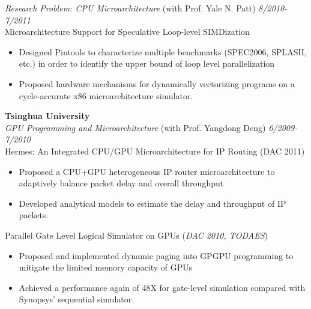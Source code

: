 \documentclass[margin, 9pt]{res} %
\begin{document}
\begin{resume}
\medskip
{\large\textit{Research Problem: CPU Microarchitecture} (with Prof. Yale N. Patt)} \hfill\textit{8/2010-7/2011}\\

\vspace*{-7pt}
Microarchitecture Support for Speculative Loop-level SIMDization\\
\vspace*{-10pt}
\begin{itemize}[leftmargin=*] \itemsep -3pt
\vspace*{-5pt}
	\item Designed Pintools to characterize multiple benchmarks (SPEC2006, SPLASH, etc.) in order to identify the upper bound of loop level parallelization
	\item Proposed hardware mechanisms for dynamically vectorizing programs on a cycle-accurate x86 microarchitecture simulator.
\end{itemize}

\bigskip
{\large\textbf{Tsinghua University}}\\

\vspace*{-7pt}
{\large\textit{GPU Programming and Microarchitecture} (with Prof. Yangdong Deng)} \hfill\textit{6/2009-7/2010}\\

\vspace*{-7pt}
Hermes: An Integrated CPU/GPU Microarchitecture for IP Routing \hfill(DAC 2011)\\
\vspace*{-10pt}
\begin{itemize}[leftmargin=*] \itemsep -3pt
\vspace*{-5pt}
	\item Proposed a CPU+GPU heterogeneous IP router microarchitecture to adaptively balance packet delay and overall throughput
	\item Developed analytical models to estimate the delay and throughput of IP packets.
\end{itemize}

\medskip
Parallel Gate Level Logical Simulator on GPUs \hfill(\textit{DAC 2010, TODAES})\\
\vspace*{-10pt}
\begin{itemize}[leftmargin=*] \itemsep -3pt
\vspace*{-5pt}
	\item Proposed and implemented dynamic paging into GPGPU programming to mitigate the limited memory capacity of GPUs
	\item Achieved a performance again of 48X for gate-level simulation compared with Synopsys' sequential simulator.
\end{itemize}


\end{resume}
\end{document}

